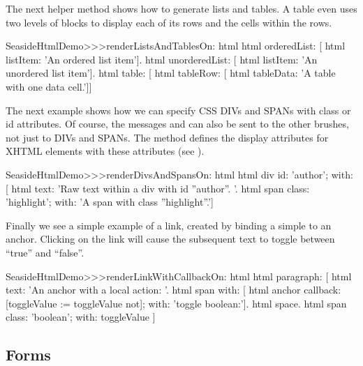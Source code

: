 \documentclass[a4paper,10pt,twoside]{book}
\begin{document}
The next helper method shows how to generate lists and tables.
A table even uses two levels of blocks to display each of its rows and the cells within the rows.

\begin{code}{}
SeasideHtmlDemo>>>renderListsAndTablesOn: html 
	html orderedList: [
		html listItem: 'An ordered list item'].
	html unorderedList: [
		html listItem: 'An unordered list item'].
	html table: [
		html tableRow: [
			html tableData: 'A table with one data cell.']]
\end{code}

The next example shows how we can specify CSS DIVs and SPANs with class or id attributes.
Of course, the messages  and  can also be sent to the other brushes, not just to DIVs and SPANs.
The method  defines the display attributes for XHTML elements with these attributes (see ).

\begin{code}{}
SeasideHtmlDemo>>>renderDivsAndSpansOn: html 
	html div
		id: 'author';
		with: [
			html text: 'Raw text within a div with id ''author''. '.
			html span
				class: 'highlight';
				with: 'A span with class ''highlight''.']
\end{code}

Finally we see a simple example of a link, created by binding a simple  to an anchor.
Clicking on the link will cause the subsequent text to toggle between ``true'' and ``false''.

\begin{code}{}
SeasideHtmlDemo>>>renderLinkWithCallbackOn: html 
	html paragraph: [
		html text: 'An anchor with a local action: '.
		html span with: [
			html anchor
				callback: [toggleValue := toggleValue not];
				with: 'toggle boolean:'].
		html space.
		html span
			class: 'boolean';
			with: toggleValue ]
\end{code}



\subsection{Forms}
\end{document}
